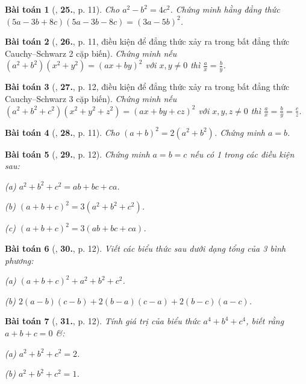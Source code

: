 \documentclass{article}
\numberwithin{equation}{section}
\newtheorem{baitoan}{Bài toán}[section]
\begin{document}
\begin{baitoan}[\cite{Binh_Toan_8_tap_1}, \textbf{25.}, p. 11]
	Cho $a^2 - b^2 = 4c^2$. Chứng minh hằng đẳng thức $(5a - 3b + 8c)(5a - 3b - 8c) = (3a - 5b)^2$.
\end{baitoan}

\begin{baitoan}[\cite{Binh_Toan_8_tap_1}, \textbf{26.}, p. 11, điều kiện để đẳng thức xảy ra trong bất đẳng thức Cauchy--Schwarz 2 cặp biến]
	Chứng minh nếu $(a^2 + b^2)(x^2 + y^2) = (ax + by)^2$ với $x,y\ne 0$ thì $\frac{a}{x} = \frac{b}{y}$.
\end{baitoan}

\begin{baitoan}[\cite{Binh_Toan_8_tap_1}, \textbf{27.}, p. 12, điều kiện để đẳng thức xảy ra trong bất đẳng thức Cauchy--Schwarz 3 cặp biến]
	Chứng minh nếu $(a^2 + b^2 + c^2)(x^2 + y^2 + z^2) = (ax + by + cz)^2$ với $x,y,z\ne 0$ thì $\frac{a}{x} = \frac{b}{y} = \frac{c}{z}$.
\end{baitoan}

\begin{baitoan}[\cite{Binh_Toan_8_tap_1}, \textbf{28.}, p. 11]
	Cho $(a + b)^2 = 2(a^2 + b^2)$. Chứng minh $a = b$.
\end{baitoan}

\begin{baitoan}[\cite{Binh_Toan_8_tap_1}, \textbf{29.}, p. 12]
	Chứng minh $a = b = c$ nếu có 1 trong các điều kiện sau:
	\begin{enumerate*}
		\item[(a)] $a^2 + b^2 + c^2 = ab + bc + ca$.
		\item[(b)] $(a + b + c)^2 = 3(a^2 + b^2 + c^2)$.
		\item[(c)] $(a + b + c)^2 = 3(ab + bc + ca)$.
	\end{enumerate*}
\end{baitoan}

\begin{baitoan}[\cite{Binh_Toan_8_tap_1}, \textbf{30.}, p. 12]
	Viết các biểu thức sau dưới dạng tổng của 3 bình phương:
	\begin{enumerate*}
		\item[(a)] $(a + b + c)^2 + a^2 + b^2 + c^2$.
		\item[(b)] $2(a - b)(c - b) + 2(b - a)(c - a) + 2(b - c)(a - c)$.
	\end{enumerate*}
\end{baitoan}

\begin{baitoan}[\cite{Binh_Toan_8_tap_1}, \textbf{31.}, p. 12]
	Tính giá trị của biểu thức $a^4 + b^4 + c^4$, biết rằng $a + b + c = 0$ \&:
	\begin{enumerate*}
		\item[(a)] $a^2 + b^2 + c^2 = 2$.
		\item[(b)] $a^2 + b^2 + c^2 = 1$.
	\end{enumerate*}
\end{baitoan}
\end{document}

